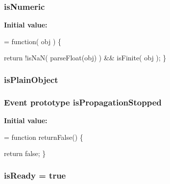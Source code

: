 \subsubsection[{is\+Numeric}]{ is\+Numeric}\label{jquery-1_810_82-vsdoc_8js_aea21b7a3297c40d5d8862345d324796b}
{\bfseries Initial value\+:}
\begin{DoxyCode}
= \textcolor{keyword}{function}( obj ) \{


        \textcolor{keywordflow}{return} !isNaN( parseFloat(obj) ) && isFinite( obj );
    \}
\end{DoxyCode}
\hypertarget{jquery-1_810_82-vsdoc_8js_ae530048a5c13705fa969015adba370e4}{}
\subsubsection[{is\+Plain\+Object}]{ is\+Plain\+Object}\label{jquery-1_810_82-vsdoc_8js_ae530048a5c13705fa969015adba370e4}
\hypertarget{jquery-1_810_82-vsdoc_8js_a67f2430529d27bb55dbfa279dc2899ea}{}
\subsubsection[{is\+Propagation\+Stopped}]{ {\bf Event} {\bf prototype} is\+Propagation\+Stopped}\label{jquery-1_810_82-vsdoc_8js_a67f2430529d27bb55dbfa279dc2899ea}
{\bfseries Initial value\+:}
\begin{DoxyCode}
= \textcolor{keyword}{function} returnFalse() \{


    \textcolor{keywordflow}{return} \textcolor{keyword}{false};
\}
\end{DoxyCode}
\hypertarget{jquery-1_810_82-vsdoc_8js_a797716c9b47d0a75c110b3852c7f25af}{}
\subsubsection[{is\+Ready}]{ is\+Ready = true}\label{jquery-1_810_82-vsdoc_8js_a797716c9b47d0a75c110b3852c7f25af}
\hypertarget{jquery-1_810_82-vsdoc_8js_a6f58346d2509049e6186d923c99f005a}{}
